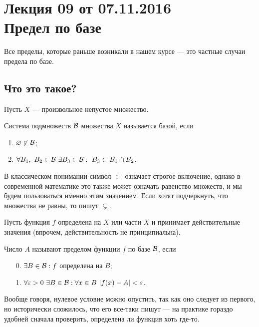 \section{Лекция 09 от 07.11.2016 \\ Предел по базе}
Все пределы, которые раньше возникали в нашем курсе --- это частные случаи предела по базе.

\subsection{Что это такое?}

Пусть $X$ --- произвольное непустое множество.

\begin{Def}
Система подмножеств $\mathcal{B}$ множества $X$ называется базой, если
\begin{enumerate}
\item $\varnothing \not\in \mathcal{B}$;
\item $\forall B_1,\ B_2 \in \mathcal{B}\ \exists B_3 \in \mathcal{B} :\ B_3 \subset B_1 \cap B_2$.
\end{enumerate}
\end{Def}

\begin{Comment}
В классическом понимании символ $\subset$ означает строгое включение, однако в современной математике это также может означать равенство множеств, и мы будем пользоваться именно этим значением. Если хотят подчеркнуть, что множества не равны, то пишут $\varsubsetneq$.
\end{Comment}

Пусть функция $f$ определена на $X$ или части $X$ и принимает действительные значения
(впрочем, действительность не принципиальна).
\begin{Def}
Число $A$ называют пределом функции $f$ по базе $\mathcal{B}$, если
\begin{itemize}
\item[0.] $\exists B \in \mathcal{B}: f$ определена на $B$;
\item[1.] $\forall \varepsilon > 0\ \exists B \in \mathcal{B}: \forall x \in B\ |f(x) - A| < \varepsilon$.
\end{itemize}
\end{Def}
Вообще говоря, нулевое условие можно опустить, так как оно следует из первого, но исторически сложилось, что его все-таки пишут --- на практике гораздо удобней сначала проверить, определена ли функция хоть где-то.

